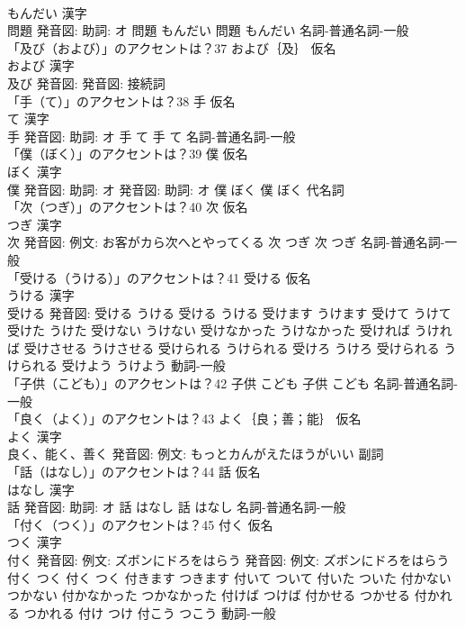 \documentclass[8pt]{extreport}
\begin{document}
\begin{CJK}{UTF8}{min}
\\	もんだい 漢字　
\\	問題 発音図: 助詞: オ	問題 もんだい		問題 もんだい				名詞-普通名詞-一般 
\\	「及び（および）」のアクセントは？37	および｛及｝ 仮名　
\\	および 漢字　
\\	及び 発音図: 発音図:							接続詞 
\\	「手（て）」のアクセントは？38	手 仮名　
\\	て 漢字　
\\	手 発音図: 助詞: オ	手 て		手 て				名詞-普通名詞-一般 
\\	「僕（ぼく）」のアクセントは？39	僕 仮名　
\\	ぼく 漢字　
\\	僕 発音図: 助詞: オ 発音図: 助詞: オ	僕 ぼく		僕 ぼく				代名詞 
\\	「次（つぎ）」のアクセントは？40	次 仮名　
\\	つぎ 漢字　
\\	次 発音図: 例文: お客がカら次へとやってくる	次 つぎ		次 つぎ				名詞-普通名詞-一般 
\\	「受ける（うける）」のアクセントは？41	受ける 仮名　
\\	うける 漢字　
\\	受ける 発音図:	受ける うける		受ける うける 受けます うけます 受けて うけて 受けた うけた 受けない うけない 受けなかった うけなかった 受ければ うければ 受けさせる うけさせる 受けられる うけられる 受けろ うけろ 受けられる うけられる 受けよう うけよう				動詞-一般 
\\	「子供（こども）」のアクセントは？42		子供 こども		子供 こども				名詞-普通名詞-一般 
\\	「良く（よく）」のアクセントは？43	よく｛良；善；能｝ 仮名　
\\	よく 漢字　
\\	良く、能く、善く 発音図: 例文: もっとカんがえたほうがいい							副詞 
\\	「話（はなし）」のアクセントは？44	話 仮名　
\\	はなし 漢字　
\\	話 発音図: 助詞: オ	話 はなし		話 はなし				名詞-普通名詞-一般 
\\	「付く（つく）」のアクセントは？45	付く 仮名　
\\	つく 漢字　
\\	付く 発音図: 例文: ズボンにドろをはらう 発音図: 例文: ズボンにドろをはらう	付く つく		付く つく 付きます つきます 付いて ついて 付いた ついた 付かない つかない 付かなかった つかなかった 付けば つけば 付かせる つかせる 付かれる つかれる 付け つけ 付こう つこう				動詞-一般 

\end{CJK}
\end{document}
